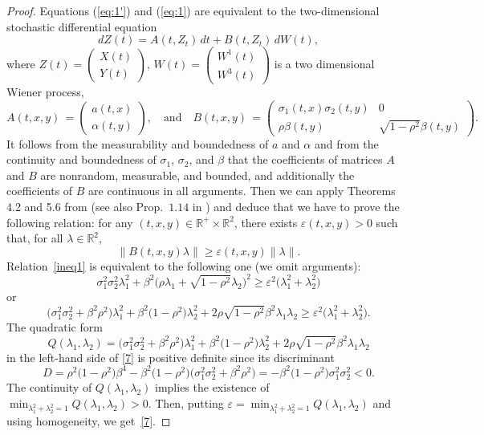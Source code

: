 \documentclass[numbers,compress,v1.0.1]{vmsta}
\theoremstyle{remark}
\newcommand{\R}{\mathbb R}
\begin{document}
\begin{proof}
Equations (\ref{eq:1'}) and (\ref{eq:1}) are equivalent to the
two-dimensional stochastic differential equation
%
\[
dZ(t) = A(t,Z_t)\,dt + B(t,Z_t)\,dW(t),
\]
%
where $Z(t) =  (
%
\begin{smallmatrix}
X(t) \\
Y(t)
\end{smallmatrix}
%
 ) $, $\displaystyle W(t) =  (
%
\begin{smallmatrix}
W^1(t) \\
W^3(t)
\end{smallmatrix}
%
 ) $ is a two dimensional Wiener process,
%
\[
A(t,x,y) \,{=} %
\begin{pmatrix}
a(t,x) \\
\alpha(t,y)
\end{pmatrix} %
,\quad \mbox{and}\quad B(t,x,y)\,{=}
%
\begin{pmatrix}
\sigma_1(t,x) \sigma_2(t,y) & 0 \\
\rho\beta(t, y) & \sqrt{1-\rho^2}\beta(t,y)
\end{pmatrix} %
.
\]
%
It follows from the measurability and boundedness of $a$ and $\alpha$
and from the continuity and boundedness of $\sigma_1$, $\sigma_2$, and
$\beta$ that the coefficients of matrices $A$ and $B$ are
nonrandom, measurable, and bounded, and additionally the coefficients
of $B$ are continuous in all arguments.
Then we can apply Theorems 4.2 and 5.6 from \cite{stroock} (see also
Prop.~$1.14$ in \cite{chrn}) and deduce that we have to prove the
following relation: for any $(t,x,y)\in\R^+\times\R^2$, there exists
$\varepsilon(t,x,y)>0$ such that, for all $\lambda\in\R^2$,
%
\begin{equation}
\label{ineq1}\big\|B(t,x,y)\lambda\big\| \geq\varepsilon (t,x,y)\|\lambda\|.
\end{equation}
%
Relation~\eqref{ineq1} is equivalent to the following one (we omit arguments):
%
\[
\sigma_1^2\sigma_2^2
\lambda_1^2 +\beta^2 \bigl(\rho
\lambda_1+\sqrt{1-\rho ^2}\lambda_2
\bigr)^2 \ge\varepsilon^2 \bigl(\lambda_1^2+
\lambda_2^2 \bigr)
\]
%
or
%
\begin{equation}
\label{7} \bigl(\sigma_1^2\sigma_2^2+
\beta^2\rho^2 \bigr)\lambda_1^2 +
\beta^2 \bigl(1-\rho^2 \bigr)\lambda_2^2
+2\rho\sqrt{1-\rho^2}\beta^2\lambda_1
\lambda_2 \ge\varepsilon^2 \bigl(\lambda_1^2+
\lambda_2^2 \bigr).
\end{equation}
%
The quadratic form
%
\[
Q(\lambda_1,\lambda_2)= \bigl(\sigma_1^2
\sigma_2^2+\beta^2\rho^2 \bigr)
\lambda_1^2 +\beta^2 \bigl(1-
\rho^2 \bigr)\lambda_2^2 +2\rho\sqrt{1-
\rho^2}\beta^2\lambda_1\lambda_2
\]
%
in the left-hand side of \eqref{7} is positive definite since its discriminant
%
\[
D=\rho^2 \bigl(1-\rho^2 \bigr)\beta^4-
\beta^2 \bigl(1-\rho^2 \bigr) \bigl(\sigma_1^2
\sigma_2^2+\beta^2\rho^2 \bigr) =-
\beta^2 \bigl(1-\rho^2 \bigr) \sigma_1^2
\sigma_2^2<0.
\]
%
The continuity of $Q(\lambda_1,\lambda_2)$ implies the existence of
$\min_{\lambda_1^2+\lambda_2^2=1}Q(\lambda_1,\lambda_2)>0$.
Then, putting
$\varepsilon=\min_{\lambda_1^2+\lambda_2^2=1}Q(\lambda_1,\lambda_2)$
and using homogeneity, we get~\eqref{7}.
\end{proof}
\end{document}

